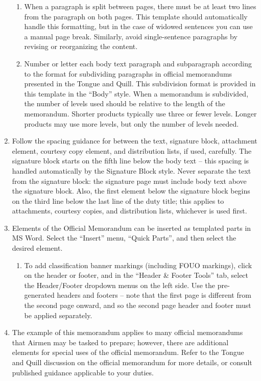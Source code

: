 \documentclass[12pt]{article}
\begin{document}
\begin{RaggedRight}
\begin{enumerate}
        \begin{enumerate}
            \item When a paragraph is split between pages, there must be at least two lines from the paragraph on both pages. This template should automatically handle this formatting, but in the case of widowed sentences you can use a manual page break. Similarly, avoid single-sentence paragraphs by revising or reorganizing the content.
            \item Number or letter each body text paragraph and subparagraph according to the format for subdividing paragraphs in official memorandums presented in the Tongue and Quill. This subdivision format is provided in this template in the “Body” style. When a memorandum is subdivided, the number of levels used should be relative to the length of the memorandum. Shorter products typically use three or fewer levels. Longer products may use more levels, but only the number of levels needed.
        \end{enumerate}
    \item Follow the spacing guidance for between the text, signature block, attachment element, courtesy copy element, and distribution lists, if used, carefully. The signature block starts on the fifth line below the body text – this spacing is handled automatically by the Signature Block style. Never separate the text from the signature block: the signature page must include body text above the signature block. Also, the first element below the signature block begins on the third line below the last line of the duty title; this applies to attachments, courtesy copies, and distribution lists, whichever is used first.
    \item Elements of the Official Memorandum can be inserted as templated parts in MS Word. Select the “Insert” menu, “Quick Parts”, and then select the desired element.
        \begin{enumerate}
            \item To add classification banner markings (including FOUO markings), click on the header or footer, and in the “Header \& Footer Tools” tab, select the Header/Footer dropdown menus on the left side. Use the pre-generated headers and footers – note that the first page is different from the second page onward, and so the second page header and footer must be applied separately.
        \end{enumerate}

\newpage
    \item The example of this memorandum applies to many official memorandums that Airmen may be tasked to prepare; however, there are additional elements for special uses of the official memorandum. Refer to the Tongue and Quill discussion on the official memorandum for more details, or consult published guidance applicable to your duties.
\end{enumerate}


\end{RaggedRight}
\end{document}
